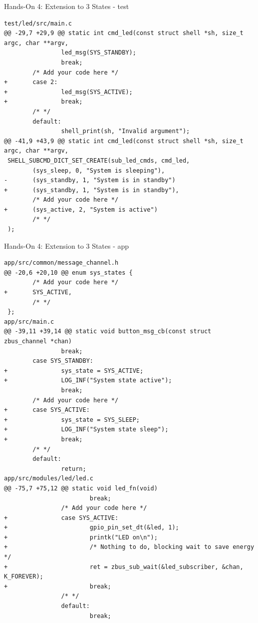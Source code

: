 \documentclass[10pt, aspectratio=169]{beamer}
\begin{document}
\begin{frame}[fragile]{Hands-On 4: Extension to 3 States - test}
  \begin{verbatim}
test/led/src/main.c
@@ -29,7 +29,9 @@ static int cmd_led(const struct shell *sh, size_t argc, char **argv,
                led_msg(SYS_STANDBY);
                break;
        /* Add your code here */
+       case 2:
+               led_msg(SYS_ACTIVE);
+               break;
        /* */
        default:
                shell_print(sh, "Invalid argument");
@@ -41,9 +43,9 @@ static int cmd_led(const struct shell *sh, size_t argc, char **argv,
 SHELL_SUBCMD_DICT_SET_CREATE(sub_led_cmds, cmd_led,
        (sys_sleep, 0, "System is sleeping"),
-       (sys_standby, 1, "System is in standby")
+       (sys_standby, 1, "System is in standby"),
        /* Add your code here */
+       (sys_active, 2, "System is active")
        /* */
 );
  \end{verbatim}
\end{frame}
\begin{frame}[fragile]{Hands-On 4: Extension to 3 States - app}
  \begin{verbatim}
app/src/common/message_channel.h
@@ -20,6 +20,10 @@ enum sys_states {
        /* Add your code here */
+       SYS_ACTIVE,
        /* */
 };
app/src/main.c
@@ -39,11 +39,14 @@ static void button_msg_cb(const struct zbus_channel *chan)
                break;
        case SYS_STANDBY:
+               sys_state = SYS_ACTIVE;
+               LOG_INF("System state active");
                break;
        /* Add your code here */
+       case SYS_ACTIVE:
+               sys_state = SYS_SLEEP;
+               LOG_INF("System state sleep");
+               break;
        /* */
        default:
                return;
app/src/modules/led/led.c
@@ -75,7 +75,12 @@ static void led_fn(void)
                        break;
                /* Add your code here */
+               case SYS_ACTIVE:
+                       gpio_pin_set_dt(&led, 1);
+                       printk("LED on\n");
+                       /* Nothing to do, blocking wait to save energy */
+                       ret = zbus_sub_wait(&led_subscriber, &chan, K_FOREVER);
+                       break;
                /* */
                default:
                        break;
  \end{verbatim}
\end{frame}
\end{document}
